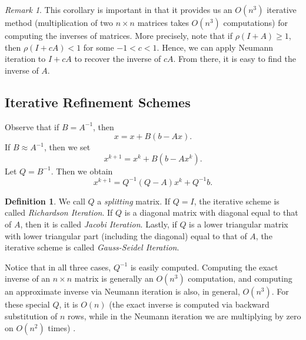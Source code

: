\documentclass[12pt]{article}
\theoremstyle{plain}
\theoremstyle{definition}
\newtheorem*{definition}{Definition}
\theoremstyle{remark}
\newtheorem*{remark}{Remark}
\numberwithin{equation}{section}  %
\begin{document}
\begin{remark}
This corollary is important in that it provides us  an $O(n^3)$ iterative method
(multiplication of two $n \times n$ matrices takes $O(n^3)$ computations) for
computing the inverses of matrices. More precisely, note that if $\rho(I + A)
\ge 1$, then $\rho(I + cA) < 1$ for some $-1 < c < 1$. Hence, we can apply
Neumann iteration to $I + cA$ to recover the inverse of $cA$. From there, it is
easy to find the inverse of $A$.
\end{remark}

\subsection{Iterative Refinement Schemes}
Observe that if $B = A^{-1}$, then
\begin{equation*}
x = x + B(b - Ax).
\end{equation*}
If $B \approx A^{-1}$, then we set
\begin{equation*}
x^{k+1} = x^{k} + B(b - Ax^{k}).
\end{equation*}
Let $Q = B^{-1}$. Then we obtain
\begin{equation*}
x^{k+1} = Q^{-1}(Q - A)x^{k} + Q^{-1}b.
\end{equation*}
\begin{definition}
We call $Q$ a \emph{splitting} matrix. If $Q = I$, the iterative scheme is
called \emph{Richardson Iteration}. If $Q$ is a diagonal matrix with diagonal
equal to that of $A$, then it is called \emph{Jacobi Iteration}. Lastly, if $Q$
is a lower triangular matrix with lower triangular part (including the diagonal)
equal to that of $A$, the iterative scheme is called \emph{Gauss-Seidel
Iteration}.
\end{definition}
Notice that in all three cases, $Q^{-1}$ is easily computed. Computing the exact inverse
of an $n \times n$ matrix is generally an $O(n^3)$ computation, and computing
an approximate inverse via Neumann iteration is also, in general, $O(n^3)$. For these special $Q$, 
it is $O(n)$ (the exact inverse is computed via backward substitution of $n$ rows, while in the
Neumann iteration we are multiplying by zero on $O(n^2)$ times) .
\end{document}
